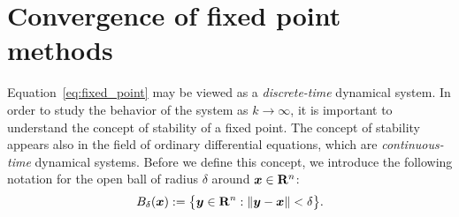 \section{Convergence of fixed point methods}
\label{sec:convergence_fixed_point_methods}
Equation~\eqref{eq:fixed_point} may be viewed as a \emph{discrete-time} dynamical system.
In order to study the behavior of the system as $k \to \infty$,
it is important to understand the concept of stability of a fixed point.
The concept of stability appears also in the field of ordinary differential equations,
which are \emph{continuous-time} dynamical systems.
Before we define this concept,
we introduce the following notation
for the open ball of radius $\delta$ around $\mathbf{\boldsymbol{x}} \in \mathbf R^n$:
\[
    B_{\delta} (\mathbf{\boldsymbol{x}}) := \bigl\{ \mathbf{\boldsymbol{y}} \in \mathbf R^n : \lVert\mathbf{\boldsymbol{y}} - \mathbf{\boldsymbol{x}}\rVert < \delta \bigr\}.
\]
\vspace{-.7cm}
